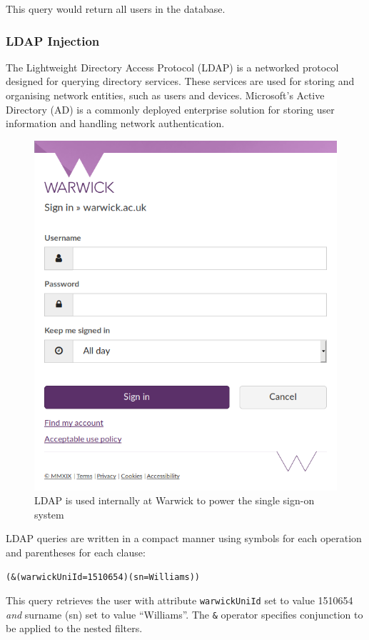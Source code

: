 This query would return all users in the database.

\subsubsection{LDAP Injection}

The Lightweight Directory Access Protocol (LDAP) is a networked protocol designed for querying directory services.
These services are used for storing and organising network entities, such as users and devices.
Microsoft's Active Directory (AD) is a commonly deployed enterprise solution for storing user information and handling
network authentication.

\begin{figure}[H]
    \begin{MyMdframed}
        \vspace{0.5em}


        \caption{\label{figure:wso}LDAP is used internally at Warwick to power the single sign-on system}
        \vspace{0.5em}
        \captionsetup{style=default}
        \begin{center}
            \includegraphics[width=0.5\linewidth]{wso.png}
        \end{center}
    \end{MyMdframed}
\end{figure}

LDAP queries are written in a compact manner using symbols for each operation and parentheses for each clause:

\texttt{(\&(warwickUniId=1510654)(sn=Williams))}

This query retrieves the user with attribute \texttt{warwickUniId} set to value 1510654 \emph{and} surname (sn) set to value
``Williams''.
The \texttt{\&} operator specifies conjunction to be applied to the nested filters.


